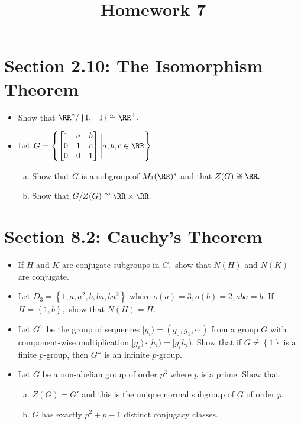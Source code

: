 \documentclass{article}
\begin{document}
\title{Homework 7}
\maketitle
\thispagestyle{fancy}

\section*{Section 2.10: The Isomorphism Theorem}

\begin{itemize}
	\item[22.] Show that $\RR^*/\left\{ 1, -1 \right\}\cong \RR^+.$

	\item[29.] Let $G=\left\{ \begin{bmatrix}
		1 & a & b \\ 0 & 1 & c \\ 0 & 0 & 1
	\end{bmatrix}\Bigg\vert a, b, c\in \RR\right\}.$ 
	\begin{enumerate}[(a)]
		\item Show that $G$ is a subgroup of $M_3(\RR)^*$ and that $Z(G)\cong \RR.$

		\item Show that $G/Z(G)\cong \RR\times\RR.$
			
	\end{enumerate}
		
\end{itemize}

\section*{Section 8.2: Cauchy's Theorem}

\begin{itemize}
	\item[7.] If $H$ and $K$ are conjugate subgroups in $G,$ show that $N(H)$ and $N(K)$ are conjugate.

	\item[14.] Let $D_3=\left\{ 1, a, a^2, b, ba, ba^2 \right\}$ where $o(a)=3, o(b)=2, aba=b.$ If $H=\left\{ 1, b \right\},$ show that $N(H)=H.$

	\item[23.] Let $G^{\omega}$ be the group of sequences $[g_i)=(g_0, g_1, \cdots)$ from a group $G$ with component-wise multiplication $[g_i)\cdot [h_i)=[g_ih_i).$ Show that if $G\neq \left\{ 1 \right\}$ is a finite $p$-group, then $G^{\omega}$ is an infinite $p$-group.

	\item[26.] Let $G$ be a non-abelian group of order $p^3$ where $p$ is a prime. Show that
		\begin{enumerate}[(a)]
			\item $Z(G)=G'$ and this is the unique normal subgroup of $G$ of order $p.$

			\item $G$ has exactly $p^2+p-1$ distinct conjugacy classes.
				
		\end{enumerate}
		
\end{itemize}
\end{document}

